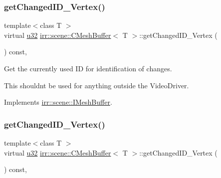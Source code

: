 \subsubsection{\texorpdfstring{get\+Changed\+I\+D\+\_\+\+Vertex()}{getChangedID\_Vertex()}\hspace{0.1cm}{\footnotesize\ttfamily [1/2]}}
{\footnotesize\ttfamily template$<$class T $>$ \\
virtual \hyperlink{namespaceirr_a0416a53257075833e7002efd0a18e804}{u32} \hyperlink{classirr_1_1scene_1_1CMeshBuffer}{irr\+::scene\+::\+C\+Mesh\+Buffer}$<$ T $>$\+::get\+Changed\+I\+D\+\_\+\+Vertex (\begin{DoxyParamCaption}{ }\end{DoxyParamCaption}) const\hspace{0.3cm}{\ttfamily [inline]}, {\ttfamily [virtual]}}



Get the currently used ID for identification of changes. 

This shouldn\textquotesingle{}t be used for anything outside the Video\+Driver. 

Implements \hyperlink{classirr_1_1scene_1_1IMeshBuffer_aba48df31edf92a0117692c0be02298db}{irr\+::scene\+::\+I\+Mesh\+Buffer}.

\mbox{\label{classirr_1_1scene_1_1CMeshBuffer_a99abc7d5f5a9f34221c58a598b33ce3a}} 
\subsubsection{\texorpdfstring{get\+Changed\+I\+D\+\_\+\+Vertex()}{getChangedID\_Vertex()}\hspace{0.1cm}{\footnotesize\ttfamily [2/2]}}
{\footnotesize\ttfamily template$<$class T $>$ \\
virtual \hyperlink{namespaceirr_a0416a53257075833e7002efd0a18e804}{u32} \hyperlink{classirr_1_1scene_1_1CMeshBuffer}{irr\+::scene\+::\+C\+Mesh\+Buffer}$<$ T $>$\+::get\+Changed\+I\+D\+\_\+\+Vertex (\begin{DoxyParamCaption}{ }\end{DoxyParamCaption}) const\hspace{0.3cm}{\ttfamily [inline]}, {\ttfamily [virtual]}}



